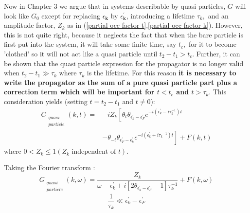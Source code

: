 Now in Chapter 3 we argue that in systems describable by quasi particles, $G$ will look like $G_{0}$ except for replacing $\epsilon_{\mathbf{k}}$ by $\epsilon_{\mathbf{k}}^{\prime}$, introducing a lifetime $\tau_{k},$ and an amplitude factor, $Z_{k}$ as in (\ref{partial-occ-factor-t},\ref{partial-occ-factor-k}). However, this is not quite right, because it neglects the fact that when the bare particle is first put into the system, it will take some finite time, say $t_{c},$ for it to become 'clothed' so it will not act like a quasi particle until $t_{2}-t_{1}>t_{c} .$ Further, it can be shown that the quasi particle expression for the propagator is no longer valid when $t_{2}-t_{1} \gg \tau_{k}$ where $\tau_{k}$ is the lifetime. For this reason \textbf{it is necessary to write the propagator as the sum of a pure quasi particle part plus a correction term which will be important for $t<t_{e}$ and $t>\tau_{k}$}. This consideration yields (setting $t=t_2-t_1$ and $t\neq0$):
\begin{equation}\begin{aligned}
G_{\substack{quasi\\particle}}(k, t)=&-i Z_{k}\left[\theta_{t} \theta_{\epsilon^{\prime}_{k}-\epsilon^{\prime}_F} e^{-i\left(\epsilon_{k}^{\prime}-i \tau_{k}^{-1}\right) t}-\right.\\
&\left.-\theta_{-t} \theta_{\epsilon^{\prime}_F-\epsilon_{k}^{\prime}} e^{-i\left(\epsilon_{k}^{\prime}+i{\tau_{k}}^{-1}\right)t}\right]+F(k, t)
\end{aligned}\end{equation}
where $0<Z_{k} \leqslant 1\left(Z_{k} \text { independent of } t\right)$. 

Taking the Fourier transform :
\begin{equation}G_{\substack{quasi\\particle}}(k, \omega)=\frac{Z_{k}}{\omega-\epsilon_{k}^{\prime}+i\left[2 \theta_{\epsilon^{\prime}_{k}-\epsilon_F^{\prime}}-1\right] \tau_{k}^{-1}}+F(k, \omega)\end{equation}
\begin{equation}\frac{1}{\tau_{k}} \ll \epsilon_{k}^{\prime}-\epsilon_{F}^{\prime}\end{equation}